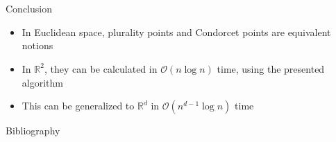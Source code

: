 \documentclass{beamer}
\newcommand{\RR}{\mathbb{R}}
\begin{document}
\section*{}
\begin{frame}{Conclusion}
  \begin{itemize}
  \item In Euclidean space, plurality points and Condorcet points are equivalent notions
  \item In \(\RR^2\), they can be calculated in \(\mathcal{O}(n \log n)\) time, using the presented
    algorithm
  \item This can be generalized to \(\RR^d\) in \(\mathcal{O}(n^{d-1} \log n)\) time
  \end{itemize}
\end{frame}


\begin{frame}{Bibliography}
  \renewcommand*{\bibfont}{\small}
  \nocite{*}
  \printbibliography
\end{frame}
\end{document}
